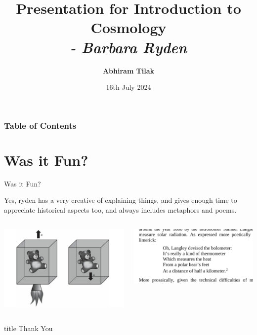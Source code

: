 \documentclass[10pt]{beamer}
\title[Introduction to Cosmology - Ryden] %
{Presentation for \textbf{Introduction to Cosmology} \\ \textit{- Barbara Ryden}}
\author[Abhiram Tilak] %
{\textbf{Abhiram Tilak}}
\institute[IIITH] %
{
	\textit{	\tiny{CND Dual Degree}} \\
	\textit{IIIT Hyderabad}
}
\date[16th July 2024] %
{16th July 2024}
\begin{document}
\begin{frame}
	\titlepage
\end{frame}

\begin{frame}
\frametitle{Table of Contents}
\tableofcontents
    \end{frame}









\section*{Was it Fun?}
\begin{frame}{Was it Fun?}

Yes, ryden has a very creative of explaining things, and gives enough time to appreciate
historical aspects too, and always includes metaphors and poems.

\begin{columns}[c]
        \begin{center}
            \includegraphics[width=\textwidth]{teddy}
        \end{center}
        \begin{center}
             \includegraphics[width=\textwidth]{destiny}
        \end{center}
\end{columns}

\end{frame}

\begin{frame}
  \begin{beamercolorbox}[sep=8pt,center,shadow=false,rounded=true]{title}
  \centering \Huge
  Thank You
  \end{beamercolorbox}
\end{frame}
\end{document}
